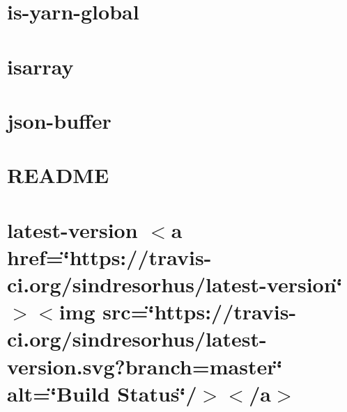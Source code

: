 \let\mypdfximage\pdfximage\def\pdfximage{\immediate\mypdfximage}\documentclass[twoside]{book}
\newcommand{\+}{\discretionary{\mbox{\scriptsize$\hookleftarrow$}}{}{}}
\begin{document}
\chapter{is-\/yarn-\/global}
\label{md__c_1__git_hub__p_r_o_y_e_c_t_o-_i_i_i-_g_o_t_rest-api-node-mysql_node_modules_is-yarn-global__r_e_a_d_m_e}

\chapter{isarray}
\label{md__c_1__git_hub__p_r_o_y_e_c_t_o-_i_i_i-_g_o_t_rest-api-node-mysql_node_modules_isarray__r_e_a_d_m_e}

\chapter{json-\/buffer}
\label{md__c_1__git_hub__p_r_o_y_e_c_t_o-_i_i_i-_g_o_t_rest-api-node-mysql_node_modules_json-buffer__r_e_a_d_m_e}

\chapter{R\+E\+A\+D\+ME}
\label{md__c_1__git_hub__p_r_o_y_e_c_t_o-_i_i_i-_g_o_t_rest-api-node-mysql_node_modules_keyv__r_e_a_d_m_e}

\chapter{latest-\/version $<$a href=\char`\"{}https\+://travis-\/ci.\+org/sindresorhus/latest-\/version\char`\"{}$>$$<$img src=\char`\"{}https\+://travis-\/ci.\+org/sindresorhus/latest-\/version.\+svg?branch=master\char`\"{} alt=\char`\"{}\+Build Status\char`\"{}/$>$$<$/a$>$}
\label{md__c_1__git_hub__p_r_o_y_e_c_t_o-_i_i_i-_g_o_t_rest-api-node-mysql_node_modules_latest-version_readme}

\end{document}
